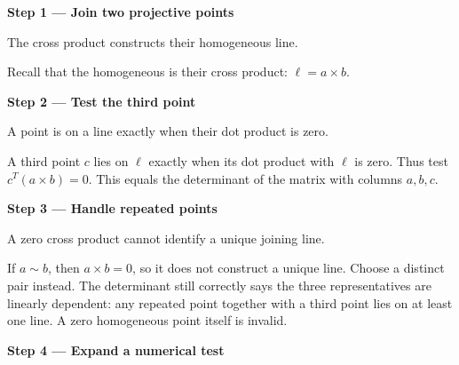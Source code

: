 \documentclass[letterpaper,11pt,english,openany,oneside]{jupyterBook}
\begin{document}
\par\medskip{}
{\color{QuizStepRed}\bfseries Step 1 — Join two projective points}\par\smallskip

\sphinxAtStartPar
{} The cross product constructs their homogeneous line.

\sphinxAtStartPar
Recall that the homogeneous  is their cross product: {\color{QuizMathBlue} \(\ell=a\times b\)}.

\par

\par\medskip{}
{\color{QuizStepRed}\bfseries Step 2 — Test the third point}\par\smallskip

\sphinxAtStartPar
{} A point is on a line exactly when their dot product is zero.

\sphinxAtStartPar
A third point {\color{QuizMathBlue} \(c\)} lies on {\color{QuizMathBlue} \(\ell\)} exactly when its dot product with {\color{QuizMathBlue} \(\ell\)} is zero. Thus test {\color{QuizMathBlue} \(\boxed{c^T(a\times b)=0}\)}. This equals the determinant of the matrix with columns {\color{QuizMathBlue} \(a,b,c\)}.

\par

\par\medskip{}
{\color{QuizStepRed}\bfseries Step 3 — Handle repeated points}\par\smallskip

\sphinxAtStartPar
{} A zero cross product cannot identify a unique joining line.

\sphinxAtStartPar
If {\color{QuizMathBlue} \(a\sim b\)}, then {\color{QuizMathBlue} \(a\times b=0\)}, so it does not construct a unique line. Choose a distinct pair instead. The determinant still correctly says the three representatives are linearly dependent: any repeated point together with a third point lies on at least one line. A zero homogeneous point itself is invalid.

\par

\par\medskip{}
{\color{QuizStepRed}\bfseries Step 4 — Expand a numerical test}\par\smallskip
\end{document}
